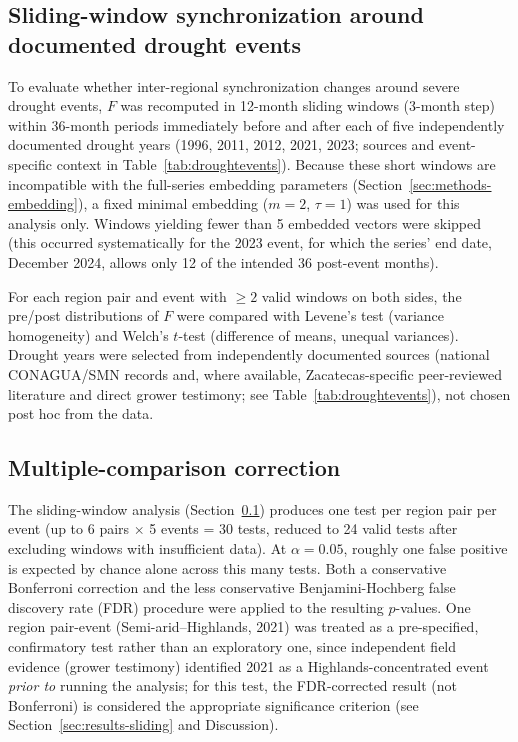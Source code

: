 \documentclass[climate,article,submit,moreauthors]{Definitions/mdpi}
\begin{document}
\subsection{Sliding-window synchronization around documented drought events}
\label{sec:methods-sliding}

To evaluate whether inter-regional synchronization changes around severe
drought events, $F$ was recomputed in 12-month sliding windows (3-month step)
within 36-month periods immediately before and after each of five
independently documented drought years (1996, 2011, 2012, 2021, 2023; sources
and event-specific context in Table~\ref{tab:droughtevents}). Because these
short windows are incompatible with the full-series embedding parameters
(Section~\ref{sec:methods-embedding}), a fixed minimal embedding ($m=2$,
$\tau=1$) was used for this analysis only. Windows yielding fewer than 5
embedded vectors were skipped (this occurred systematically for the 2023
event, for which the series' end date, December 2024, allows only 12 of the
intended 36 post-event months).

For each region pair and event with $\geq 2$ valid windows on both sides, the
pre/post distributions of $F$ were compared with Levene's test (variance
homogeneity) and Welch's $t$-test (difference of means, unequal variances).
Drought years were selected from independently documented sources (national
CONAGUA/SMN records and, where available, Zacatecas-specific peer-reviewed
literature and direct grower testimony; see Table~\ref{tab:droughtevents}),
not chosen post hoc from the data.

\subsection{Multiple-comparison correction}
\label{sec:methods-mcc}

The sliding-window analysis (Section~\ref{sec:methods-sliding}) produces one
test per region pair per event (up to 6 pairs $\times$ 5 events = 30 tests,
reduced to 24 valid tests after excluding windows with insufficient data). At
$\alpha=0.05$, roughly one false positive is expected by chance alone across
this many tests. Both a conservative Bonferroni correction and the less
conservative Benjamini-Hochberg false discovery rate (FDR) procedure were
applied to the resulting $p$-values. One region pair-event
(Semi-arid--Highlands, 2021) was treated as a pre-specified, confirmatory test
rather than an exploratory one, since independent field evidence (grower
testimony) identified 2021 as a Highlands-concentrated event \textit{prior to}
running the analysis; for this test, the FDR-corrected result (not Bonferroni)
is considered the appropriate significance criterion (see
Section~\ref{sec:results-sliding} and Discussion).
\end{document}
